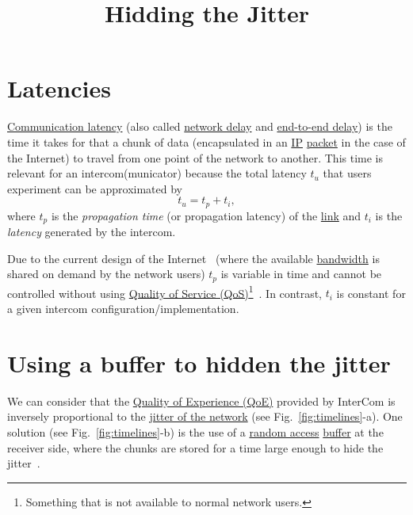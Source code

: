 
\title{Hidding the Jitter}

\maketitle
\tableofcontents

\section{Latencies}
\href{https://en.wikipedia.org/wiki/Latency_(engineering)#Communication_latency}{Communication
  latency} (also called
\href{https://en.wikipedia.org/wiki/Network_delay}{network delay} and
\href{https://en.wikipedia.org/wiki/End-to-end_delay}{end-to-end
  delay}) is the time it takes for that a chunk of data (encapsulated
in an \href{https://en.wikipedia.org/wiki/Internet_Protocol}{IP}
\href{https://en.wikipedia.org/wiki/Network_packet}{packet} in the
case of the Internet) to travel from one point of the network to
another. This time is relevant for an intercom(municator) because the
total latency $t_u$ that users experiment can be approximated by
\begin{equation}
  t_u = t_p + t_i,
  \label{eq:user_latency}
\end{equation}
where $t_p$ is the \emph{propagation time} (or propagation latency) of
the \href{https://en.wikipedia.org/wiki/Telecommunications_link}{link}
and $t_i$ is the \emph{latency} generated by the intercom.

Due to the current design of the Internet~\cite{Tanenbaum,Stallings}
(where the available
\href{https://en.wikipedia.org/wiki/Bandwidth_(computing)}{bandwidth}
is shared on demand by the network users) $t_p$ is variable in time
and cannot be controlled without using
\href{https://en.wikipedia.org/wiki/Quality_of_service}{Quality of
  Service (QoS)}\footnote{Something that is not available to normal
network users.}~\cite{dordal2020intro}. In contrast, $t_i$ is constant
for a given intercom configuration/implementation.

\section{Using a buffer to hidden the jitter}

We can consider that the
\href{https://en.wikipedia.org/wiki/Quality_of_experience}{Quality of
  Experience (QoE)} provided by InterCom is inversely proportional to
the \href{https://en.wikipedia.org/wiki/Packet_delay_variation}{jitter
  of the network} (see Fig.~\ref{fig:timelines}-a). One solution (see
Fig.~\ref{fig:timelines}-b) is the use of a
\href{https://en.wikipedia.org/wiki/Random_access}{random access}
\href{https://en.wikipedia.org/wiki/Data_buffer}{buffer} at the
receiver side, where the chunks are stored for a time large enough to
hide the jitter~\cite{Kurose-Ross}.

